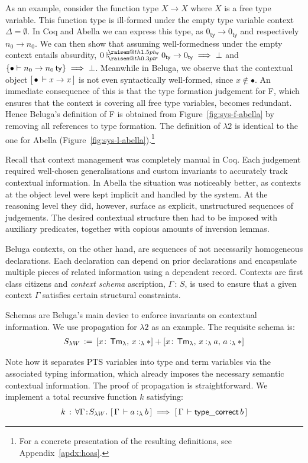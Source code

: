 \documentclass[a4paper,UKenglish]{lipics-v2016}
\makeatletter
\newcommand{\ms}{\,}
\newcommand{\mrel}[1]{\mathrel{\ms #1 \ms}}
\newcommand{\OF}{\mrel{:}}
\newcommand{\mAll}[1]{\ensuremath{\forall} #1.\ms\ms}
\newcommand{\eqdef}{\mrel{:=}}
\newcommand{\SysL}{$\lambda2$\xspace}
\newcommand{\TmL}{\ensuremath{\mathsf{Tm_{\lambda}}}}
\newcommand{\ty}{\mathsf{ty}}
\newcommand{\of}{\ensuremath{\!:\!}}
\newcommand{\raisemath}[1]{\mathpalette{\raisem@th{#1}}}
\newcommand{\raisem@th}[3]{\raisebox{#1}{\ensuremath{#2#3}}}
\newcommand{\tsAnnot}[2]{\vdash\hspace{-.7em}^{\raisemath{1.5pt}{\scriptscriptstyle{#2}}}_{\raisemath{0.3pt}{\scriptscriptstyle{#1}}}} %
\newcommand{\tfF}{\tsAnnot{\mathsf{F}}{\ty}}  %
\newcommand{\istyF}[2]{\ensuremath{{#1} \mathrel{\tfF} #2}}
\newcommand{\istyFh}[1]{\ensuremath{#1\ms\mathsf{ty}}}
\newcommand{\typingLh}[2]{\ensuremath{#1 \mathbin{:_{\lambda}} #2}}
\newcommand{\Prp}{\ensuremath{\textrm{\textasteriskcentered}}}
\newcommand{\emptyctx}{\ensuremath{\bullet}}
\theoremstyle{plain}
\makeatother
\begin{document}
As an example, consider the function type $X \to X$ where $X$ is a free type variable.
This function type is ill-formed under the empty type variable context $\Delta = \emptyset$.
In Coq and Abella we can express this type, as $0_\ty \to 0_\ty$ and respectively $n_0 \to n_0$.
We can then show that assuming well-formedness under the empty context entails absurdity, $\istyF{0}{0_\ty \to 0_\ty} \implies \bot$ and $\aj{\emptyctx}{\istyFh{n_0 \to n_0}} \implies \bot$.
Meanwhile in Beluga, we observe that the contextual object $\bc{\emptyctx}{x \to x}$ is not even syntactically well-formed, since $x \notin \emptyctx$.
An immediate consequence of this is that the type formation judgement for F, which ensures that the context is covering all free type variables, becomes redundant.
Hence Beluga's definition of F is obtained from Figure~\ref{fig:sys-f-abella} by removing all references to type formation.
The definition of \SysL is identical to the one for Abella (Figure~\ref{fig:sys-l-abella}).\footnote{For a concrete presentation of the resulting definitions, see Appendix~\ref{apdx:hoas}.}

Recall that context management was completely manual in Coq.
Each judgement required well-chosen generalisations and custom invariants to accurately track contextual information.
In Abella the situation was noticeably better, as contexts at the object level were kept implicit and handled by the system.
At the reasoning level they did, however, surface as explicit, unstructured sequences of judgements.
The desired contextual structure then had to be imposed with auxiliary predicates, together with copious amounts of inversion lemmas.

Beluga contexts, on the other hand, are sequences of not necessarily homogeneous declarations.
Each declaration can depend on prior declarations and encapsulate multiple pieces of related information using a dependent record.
Contexts are first class citizens and \emph{context schema} ascription, $\Gamma \OF S$, is used to ensure that a given context $\Gamma$ satisfies certain structural constraints.

Schemas are Beluga's main device to enforce invariants on contextual information.
We use propagation for \SysL as an example.
The requisite schema is:
\begin{align*}
  S_{\lambda W} \eqdef [x\sof\TmL \ssep \typingLh{x}{\Prp}] + [x\sof\TmL \ssep \typingLh{x}{a} \ssep \typingLh{a}{\Prp}]
\end{align*}

Note how it separates PTS variables into type and term variables via the associated typing information, which already imposes the necessary semantic contextual information.
The proof of propagation is straightforward.
We implement a total recursive function $k$ satisfying:
\begin{align*}
  k \OF \mAll{\Gamma \of S_{\lambda W}} \bc{\Gamma}{\typingLh{a}{b}} \implies \bc{\Gamma}{\mathsf{type\_correct}\,b}
\end{align*}
\end{document}
